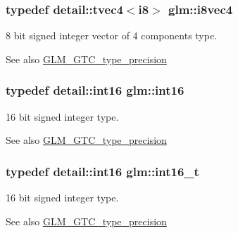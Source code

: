 \subsubsection[{i8vec4}]{\setlength{\rightskip}{0pt plus 5cm}typedef detail\+::tvec4$<$i8$>$ {\bf glm\+::i8vec4}}\label{group__gtc__type__precision_gad65f6cda14cdf79b2e8afe6ec8ab3725}
8 bit signed integer vector of 4 components type. \begin{DoxySeeAlso}{See also}
\hyperlink{group__gtc__type__precision}{G\+L\+M\+\_\+\+G\+T\+C\+\_\+type\+\_\+precision} 
\end{DoxySeeAlso}
\hypertarget{group__gtc__type__precision_ga2945a61d12771f8954994fcddf02b021}{}
\subsubsection[{int16}]{\setlength{\rightskip}{0pt plus 5cm}typedef detail\+::int16 {\bf glm\+::int16}}\label{group__gtc__type__precision_ga2945a61d12771f8954994fcddf02b021}
16 bit signed integer type. \begin{DoxySeeAlso}{See also}
\hyperlink{group__gtc__type__precision}{G\+L\+M\+\_\+\+G\+T\+C\+\_\+type\+\_\+precision} 
\end{DoxySeeAlso}
\hypertarget{group__gtc__type__precision_gaf89ee61e0d34aa4a462104b7ae7f2da6}{}
\subsubsection[{int16\+\_\+t}]{\setlength{\rightskip}{0pt plus 5cm}typedef detail\+::int16 {\bf glm\+::int16\+\_\+t}}\label{group__gtc__type__precision_gaf89ee61e0d34aa4a462104b7ae7f2da6}
16 bit signed integer type. \begin{DoxySeeAlso}{See also}
\hyperlink{group__gtc__type__precision}{G\+L\+M\+\_\+\+G\+T\+C\+\_\+type\+\_\+precision} 
\end{DoxySeeAlso}
\hypertarget{group__gtc__type__precision_ga632d8b25f6b61659f39ea4321fab92a4}{}
